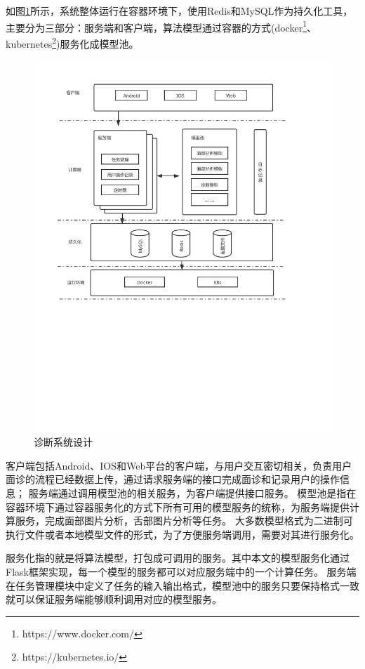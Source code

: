 如图\ref{fig:system}所示，系统整体运行在容器环境下，使用Redis和MySQL作为持久化工具，主要分为三部分：服务端和客户端，算法模型通过容器的方式(docker\footnote{https://www.docker.com/}、kubernetes\footnote{https://kubernetes.io/})服务化成模型池。
\begin{figure}
    \centering
    \includegraphics[width=15cm]{images/system2.pdf}
    \caption{诊断系统设计}
    \label{fig:system}
\end{figure}
客户端包括Android、IOS和Web平台的客户端，与用户交互密切相关，负责用户面诊的流程已经数据上传，通过请求服务端的接口完成面诊和记录用户的操作信息；
服务端通过调用模型池的相关服务，为客户端提供接口服务。
模型池是指在容器环境下通过容器服务化的方式下所有可用的模型服务的统称，为服务端提供计算服务，完成面部图片分析，舌部图片分析等任务。
大多数模型格式为二进制可执行文件或者本地模型文件的形式，为了方便服务端调用，需要对其进行服务化。

服务化指的就是将算法模型，打包成可调用的服务。其中本文的模型服务化通过Flask框架实现，每一个模型的服务都可以对应服务端中的一个计算任务。
服务端在任务管理模块中定义了任务的输入输出格式，模型池中的服务只要保持格式一致就可以保证服务端能够顺利调用对应的模型服务。

